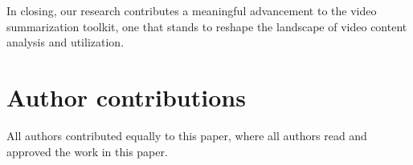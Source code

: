 \documentclass{ieeeaccess}
\begin{document}
In closing, our research contributes a meaningful advancement to the video summarization toolkit, one that stands to reshape the landscape of video content analysis and utilization.



\section*{Author contributions}
All authors contributed equally to this paper, where all authors read and approved the work in this paper.






\EOD
\end{document}
